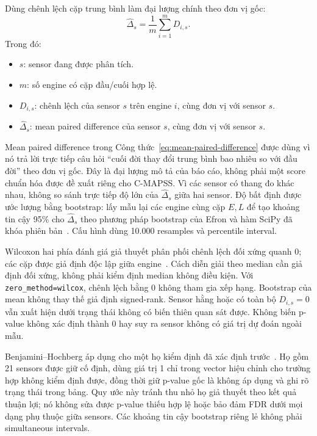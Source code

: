 Dùng chênh lệch cặp trung bình làm đại lượng chính theo đơn vị gốc:
\begin{equation}
 \widehat{\Delta}_s=\frac{1}{m}\sum_{i=1}^{m}D_{i,s}.
 \label{eq:mean-paired-difference}
\end{equation}
\noindent Trong đó:
\begin{itemize}[label={+},leftmargin=1.6em,itemsep=0.15em,topsep=0.25em]
\item $s$: sensor đang được phân tích.
\item $m$: số engine có cặp đầu/cuối hợp lệ.
\item $D_{i,s}$: chênh lệch của sensor $s$ trên engine $i$, cùng đơn vị với
sensor $s$.
\item $\widehat{\Delta}_s$: mean paired difference của sensor $s$, cùng đơn vị
với sensor $s$.
\end{itemize}
Mean paired difference trong Công thức~\ref{eq:mean-paired-difference} được
dùng vì nó trả lời trực tiếp câu hỏi ``cuối đời thay đổi trung bình bao nhiêu so
với đầu đời'' theo đơn vị gốc. Đây là đại lượng mô tả của báo cáo, không phải
một score chuẩn hóa được đề xuất riêng cho C-MAPSS. Vì các sensor có thang đo
khác nhau, không so sánh trực tiếp độ lớn của $\widehat{\Delta}_s$ giữa hai
sensor. Độ bất định được ước lượng bằng bootstrap: lấy mẫu lại các engine cùng
cặp $E,L$ để tạo khoảng tin cậy 95\% cho $\widehat{\Delta}_s$ theo phương pháp
bootstrap của Efron và hàm SciPy đã khóa phiên bản~\cite{efron1979bootstrap,scipyBootstrap}.
Cấu hình dùng 10.000 resamples và percentile interval.

Wilcoxon hai phía đánh giá giả thuyết phân phối chênh lệch đối xứng quanh 0;
các cặp được giả định độc lập giữa engine~\cite{scipyWilcoxon}. Cách diễn giải
theo median cần giả định đối xứng, không phải kiểm định median không điều kiện.
Với \texttt{zero\_method=wilcox}, chênh lệch bằng 0 không tham gia xếp hạng.
Bootstrap của mean không thay thế giả định signed-rank. Sensor hằng hoặc có
toàn bộ $D_{i,s}=0$ vẫn xuất hiện dưới trạng thái không có biến thiên quan sát
được. Không biến p-value không xác định thành 0 hay suy ra sensor không có
giá trị dự đoán ngoài mẫu.

Benjamini--Hochberg áp dụng cho một họ kiểm định đã xác định trước~\cite{benjamini1995fdr,scipyFDR}. Họ gồm 21 sensors được giữ cố định, dùng giá trị 1 chỉ trong vector hiệu chỉnh cho trường hợp không kiểm định được, đồng thời giữ p-value gốc là không áp dụng và ghi rõ trạng thái trong bảng. Quy ước này tránh thu nhỏ họ giả thuyết theo kết quả thuận lợi; nó không sửa được p-value thiếu hợp lệ hoặc bảo đảm FDR dưới mọi dạng phụ thuộc giữa sensors. Các khoảng tin cậy bootstrap riêng lẻ không phải simultaneous intervals.

